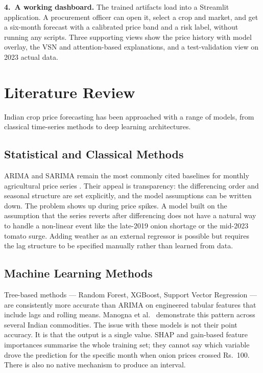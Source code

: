 \documentclass[conference,twoside]{IEEEtran}
\begin{document}
\textbf{4.\ A working dashboard.} The trained artifacts load into a Streamlit application. A procurement officer can open it, select a crop and market, and get a six-month forecast with a calibrated price band and a risk label, without running any scripts. Three supporting views show the price history with model overlay, the VSN and attention-based explanations, and a test-validation view on 2023 actual data.

\section{Literature Review}
\label{sec:literature}

Indian crop price forecasting has been approached with a range of models, from classical time-series methods to deep learning architectures.

\subsection{Statistical and Classical Methods}
ARIMA and SARIMA remain the most commonly cited baselines for monthly agricultural price series \cite{box2015arima}. Their appeal is transparency: the differencing order and seasonal structure are set explicitly, and the model assumptions can be written down. The problem shows up during price spikes. A model built on the assumption that the series reverts after differencing does not have a natural way to handle a non-linear event like the late-2019 onion shortage or the mid-2023 tomato surge. Adding weather as an external regressor is possible but requires the lag structure to be specified manually rather than learned from data.

\subsection{Machine Learning Methods}
Tree-based methods --- Random Forest, XGBoost, Support Vector Regression --- are consistently more accurate than ARIMA on engineered tabular features that include lags and rolling means. Manogna et al.\ \cite{manogna2025deep} demonstrate this pattern across several Indian commodities. The issue with these models is not their point accuracy. It is that the output is a single value. SHAP and gain-based feature importances summarise the whole training set; they cannot say which variable drove the prediction for the specific month when onion prices crossed Rs.\ 100. There is also no native mechanism to produce an interval.
\end{document}
